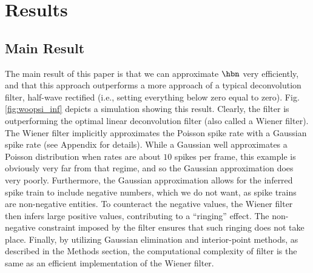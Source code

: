 \section{Results} \label{sec:results}

\subsection{Main Result} \label{sec:main}

The main result of this paper is that we can approximate $\hbn$ very efficiently, and that this approach outperforms a more \naive approach of a typical deconvolution filter, half-wave rectified (i.e., setting everything below zero equal to zero).  Fig. \ref{fig:woopsi_inf} depicts a simulation showing this result. Clearly, the \foopsi filter is outperforming the optimal linear deconvolution filter (also called a Wiener filter).  The Wiener filter implicitly approximates the Poisson spike rate with a Gaussian spike rate (see Appendix for details). While a Gaussian well approximates a Poisson distribution when rates are about $10$ spikes per frame, this example is obviously very far from that regime, and so the Gaussian approximation does very poorly. Furthermore, the Gaussian approximation allows for the inferred spike train to include negative numbers, which we do not want, as spike trains are non-negative entities.  To counteract the negative values, the Wiener filter then infers large positive values, contributing to a ``ringing'' effect.  The non-negative constraint imposed by the \foopsi filter ensures that such ringing does not take place.  Finally, by utilizing Gaussian elimination and interior-point methods, as described in the Methods section, the computational complexity of \foopsi filter is the same as an efficient implementation of the Wiener filter.  


